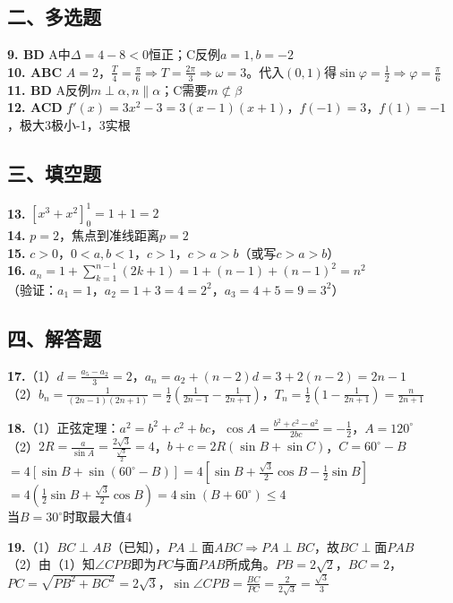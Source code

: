\documentclass[12pt,a4paper]{ctexart}
\begin{document}
\subsection*{二、多选题}
\textbf{9. BD} A中$\Delta=4-8<0$恒正；C反例$a=1,b=-2$\\
\textbf{10. ABC} $A=2$，$\frac{T}{4}=\frac{\pi}{6}\Rightarrow T=\frac{2\pi}{3}\Rightarrow\omega=3$。代入$(0,1)$得$\sin\varphi=\frac12\Rightarrow\varphi=\frac{\pi}{6}$\\
\textbf{11. BD} A反例$m\perp\alpha,n\parallel\alpha$；C需要$m\not\subset\beta$\\
\textbf{12. ACD} $f'(x)=3x^2-3=3(x-1)(x+1)$，$f(-1)=3$，$f(1)=-1$，极大3极小-1，3实根

\subsection*{三、填空题}
\textbf{13.} $[x^3+x^2]_0^1=1+1=2$\\
\textbf{14.} $p=2$，焦点到准线距离$p=2$\\
\textbf{15.} $c>0$，$0<a,b<1$，$c>1$，$c>a>b$（或写$c>a>b$）\\
\textbf{16.} $a_n=1+\sum_{k=1}^{n-1}(2k+1)=1+(n-1)+(n-1)^2=n^2$\\
（验证：$a_1=1$，$a_2=1+3=4=2^2$，$a_3=4+5=9=3^2$）

\subsection*{四、解答题}
\textbf{17.}（1）$d=\frac{a_5-a_2}{3}=2$，$a_n=a_2+(n-2)d=3+2(n-2)=2n-1$\\
（2）$b_n=\frac1{(2n-1)(2n+1)}=\frac12(\frac1{2n-1}-\frac1{2n+1})$，$T_n=\frac12(1-\frac1{2n+1})=\frac{n}{2n+1}$

\textbf{18.}（1）正弦定理：$a^2=b^2+c^2+bc$，$\cos A=\frac{b^2+c^2-a^2}{2bc}=-\frac12$，$A=120^\circ$\\
（2）$2R=\frac{a}{\sin A}=\frac{2\sqrt3}{\frac{\sqrt3}{2}}=4$，$b+c=2R(\sin B+\sin C)$，$C=60^\circ-B$\\
$=4[\sin B+\sin(60^\circ-B)]=4[\sin B+\frac{\sqrt3}{2}\cos B-\frac12\sin B]$
$=4(\frac12\sin B+\frac{\sqrt3}{2}\cos B)=4\sin(B+60^\circ)\le4$\\
当$B=30^\circ$时取最大值$4$

\textbf{19.}（1）$BC\perp AB$（已知），$PA\perp$面$ABC\Rightarrow PA\perp BC$，故$BC\perp$面$PAB$\\
（2）由（1）知$\angle CPB$即为$PC$与面$PAB$所成角。$PB=2\sqrt2$，$BC=2$，$PC=\sqrt{PB^2+BC^2}=2\sqrt3$，$\sin\angle CPB=\frac{BC}{PC}=\frac{2}{2\sqrt3}=\frac{\sqrt3}{3}$
\end{document}
